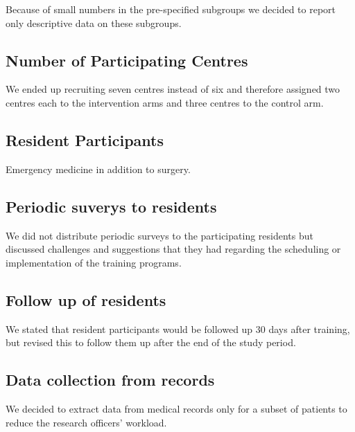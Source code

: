 \documentclass[
]{article}
\begin{document}
Because of small numbers in the pre-specified subgroups we decided to report only descriptive data on these subgroups.

\hypertarget{number-of-participating-centres}{%
\subsection{Number of Participating Centres}\label{number-of-participating-centres}}

We ended up recruiting seven centres instead of six and therefore assigned two centres each to the intervention arms and three centres to the control arm.

\hypertarget{resident-participants}{%
\subsection{Resident Participants}\label{resident-participants}}

Emergency medicine in addition to surgery.

\hypertarget{periodic-suverys-to-residents}{%
\subsection{Periodic suverys to residents}\label{periodic-suverys-to-residents}}

We did not distribute periodic surveys to the participating residents but discussed challenges and suggestions that they had regarding the scheduling or implementation of the training programs.

\hypertarget{follow-up-of-residents}{%
\subsection{Follow up of residents}\label{follow-up-of-residents}}

We stated that resident participants would be followed up 30 days after training, but revised this to follow them up after the end of the study period.

\hypertarget{data-collection-from-records}{%
\subsection{Data collection from records}\label{data-collection-from-records}}

We decided to extract data from medical records only for a subset of patients to reduce the research officers' workload.
\end{document}
